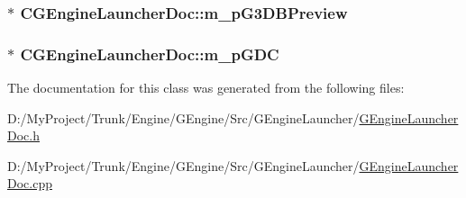 \subsubsection[{m\+\_\+p\+G3\+D\+B\+Preview}]{$\ast$ C\+G\+Engine\+Launcher\+Doc\+::m\+\_\+p\+G3\+D\+B\+Preview}\label{class_c_g_engine_launcher_doc_aa2dd694dffbc1da4fe9a59a0dfe54337}
\hypertarget{class_c_g_engine_launcher_doc_a9d7b6413c974d317a5e6e73b422ef1ee}{}
\subsubsection[{m\+\_\+p\+G\+D\+C}]{$\ast$ C\+G\+Engine\+Launcher\+Doc\+::m\+\_\+p\+G\+D\+C}\label{class_c_g_engine_launcher_doc_a9d7b6413c974d317a5e6e73b422ef1ee}


The documentation for this class was generated from the following files\+:\begin{DoxyCompactItemize}
\item 
D\+:/\+My\+Project/\+Trunk/\+Engine/\+G\+Engine/\+Src/\+G\+Engine\+Launcher/\hyperlink{_g_engine_launcher_doc_8h}{G\+Engine\+Launcher\+Doc.\+h}\item 
D\+:/\+My\+Project/\+Trunk/\+Engine/\+G\+Engine/\+Src/\+G\+Engine\+Launcher/\hyperlink{_g_engine_launcher_doc_8cpp}{G\+Engine\+Launcher\+Doc.\+cpp}\end{DoxyCompactItemize}
